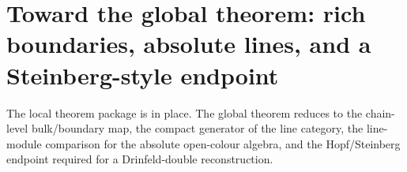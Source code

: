 \label{chap:ht-bulk-boundary-line-frontier}

\providecommand{\kk}{\mathbb{k}}
\providecommand{\cO}{\mathcal O}
\providecommand{\SCop}{\mathsf{SC}^{\mathrm{ch,top}}}
\providecommand{\gSC}{\mathfrak{g}^{\mathrm{SC}}}
\providecommand{\cC}{\mathcal C}
\providecommand{\cL}{\mathcal L}
\providecommand{\cM}{\mathcal M}
\providecommand{\cJ}{\mathcal J}
\providecommand{\Ainf}{\mathsf{A}_{\infty}}
\providecommand{\Linf}{L_\infty}
\providecommand{\Sym}{\operatorname{Sym}}
\providecommand{\PV}{\operatorname{PV}}
\providecommand{\ot}{\otimes}
\providecommand{\CE}{\operatorname{CE}}
\providecommand{\HH}{\operatorname{HH}}
\providecommand{\RHom}{\operatorname{RHom}}
\providecommand{\BBar}{\operatorname{Bar}}
\providecommand{\Cobar}{\operatorname{\Omega}}
\providecommand{\Spec}{\operatorname{Spec}}
\providecommand{\Spf}{\operatorname{Spf}}

\providecommand{\End}{\operatorname{End}}
\providecommand{\Hom}{\operatorname{Hom}}
\providecommand{\Der}{\operatorname{Der}}
\providecommand{\gr}{\operatorname{gr}}
\providecommand{\im}{\operatorname{im}}
\providecommand{\coker}{\operatorname{coker}}
\providecommand{\id}{\operatorname{id}}
\providecommand{\Perf}{\operatorname{Perf}}
\providecommand{\Cl}{\operatorname{Cl}}
\providecommand{\dCrit}{\operatorname{dCrit}}
\providecommand{\Zder}{\operatorname{Z}_{\mathrm{der}}}
\providecommand{\mc}{\operatorname{MC}}
\providecommand{\op}{\mathrm{op}}
\providecommand{\der}{\mathrm{der}}
\providecommand{\Abulk}{A_{\mathrm{bulk}}}
\providecommand{\Bbound}{B_{\partial}}
\providecommand{\Kline}{K_{\mathrm{line}}}
\providecommand{\intr}{\mathrm{intr}}
\providecommand{\free}{\mathrm{free}}
\providecommand{\eff}{\mathrm{eff}}
\providecommand{\st}{\mathrm{st}}
\providecommand{\ex}{\mathrm{ex}}
\providecommand{\minmod}{\mathrm{min}}
\providecommand{\expmod}{\mathrm{exp}}
\providecommand{\hkR}{\mathrm{HKR}}
\providecommand{\sn}{\mathrm{SN}}
\providecommand{\lines}{\mathsf{Lines}}
\providecommand{\hSym}{\widehat{\Sym}}

\section{Toward the global theorem: rich boundaries, absolute lines, and a Steinberg-style endpoint}\label{sec:global}

The local theorem package is in place. The global theorem reduces to
the chain-level bulk/boundary map, the compact generator of the line
category, the line-module comparison for the absolute open-colour
algebra, and the Hopf/Steinberg endpoint required for a
Drinfeld-double reconstruction.

